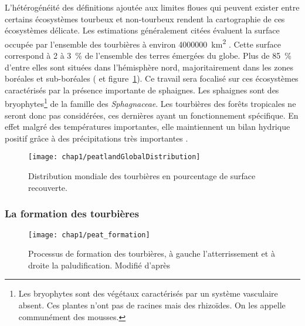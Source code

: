 L'hétérogénéité des définitions ajoutée aux limites floues qui peuvent exister entre certains écosystèmes tourbeux et non-tourbeux rendent la cartographie de ces écosystèmes délicate.
Les estimations généralement citées évaluent la surface occupée par l'ensemble des tourbières à environ \SI{4000000}{\square\kilo\meter} \citep{lappalainen1996}. 
Cette surface correspond à \num{2} à \SI{3}{\percent} de l'ensemble des terres émergées du globe.
Plus de \SI{85}{\percent} d'entre elles sont situées dans l'hémisphère nord, majoritairement dans les zones boréales et sub-boréales (\citealp{strack2008} et figure~\ref{fig:peatlandGlobalDistribution}).
Ce travail sera focalisé sur ces écosystèmes caractérisés par la présence importante de sphaignes.
Les sphaignes sont des bryophytes\footnote{Les bryophytes sont des végétaux caractérisés par un système vasculaire absent. Ces plantes n'ont pas de racines mais des rhizoïdes. On les appelle communément des mousses.} de la famille des \textit{Sphagnaceae}.
Les tourbières des forêts tropicales ne seront donc pas considérées, ces dernières ayant un fonctionnement spécifique.
En effet malgré des températures importantes, elle maintiennent un bilan hydrique positif grâce à des précipitations très importantes \citep{chimner2005}.

\begin{figure}
\centering
\texttt{[image: chap1/peatlandGlobalDistribution]}
\caption{Distribution mondiale des tourbières en pourcentage de surface recouverte.}
\label{fig:peatlandGlobalDistribution} 
\end{figure}

\subsubsection{La formation des tourbières}

\begin{figure}
\centering
\texttt{[image: chap1/peat\_formation]}
\caption{Processus de formation des tourbières, à gauche l'atterrissement et à droite la paludification. Modifié d'après \citet{manneville1999}}
\label{fig:peat_formation}
\end{figure}


